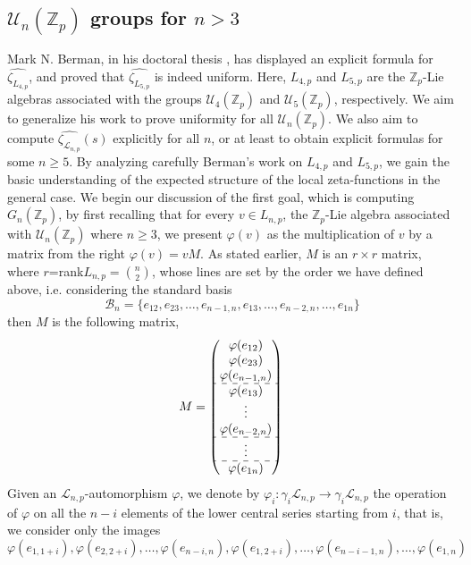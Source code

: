 \documentclass[12pt]{article}
\begin{document}
\subsection{$\mathcal{U}_n(\mathbb{Z}_p)$ groups for $n>3$}
Mark N. Berman, in his doctoral thesis \cite{Berman}, has displayed an explicit formula for $\hat{\zeta_{L_{4,p}}}$, and proved that $\hat{\zeta_{L_{5,p}}}$ is indeed uniform. Here, $L_{4,p}$ and $L_{5,p}$ are the $\mathbb{Z}_p$-Lie algebras associated with the groups $\mathcal{U}_4(\mathbb{Z}_p)$ and $\mathcal{U}_5(\mathbb{Z}_p)$, respectively. We aim to generalize his work to prove uniformity for all $\mathcal{U}_n(\mathbb{Z}_p)$. We also aim to compute $\hat{\zeta_{\mathcal{L}_{n,p}}}(s)$ explicitly for all $n$, or at least to obtain explicit formulas for some $n\geq 5$. By analyzing carefully Berman's work on $L_{4,p}$ and $L_{5,p}$, we gain the basic understanding of the expected structure of the local zeta-functions in the general case.
We begin our discussion of the first goal, which is computing $G_n(\mathbb{Z}_p)$, by first recalling that for every $v\in L_{n,p}$, the $\mathbb{Z}_p$-Lie algebra associated with $\mathcal{U}_n(\mathbb{Z}_p)$ where $n\geq3$, we present $\varphi(v)$ as the multiplication of $v$ by a matrix from the right $\varphi(v)=vM$. As stated earlier, $M$ is an $r\times r$ matrix, where $r$=rank$L_{n,p}=\binom{n}{2}$, whose lines are set by the order we have defined above, i.e. considering the standard basis \[\mathcal{B}_n=\{e_{
12},e_{23},\dots,e_{n-1,n},e_{13},\dots,e_{n-2,n},\dots,e_{1n}\}\] then $M$ is the following matrix,
$$
M=\begin{pmatrix}
\varphi(e_{12})\\
\varphi(e_{23})\\
\varphi(e_{n-1,n})\\
\hdashline
\varphi(e_{13})\\
\vdots\\
\varphi(e_{n-2,n})\\
\hdashline
\vdots\\
\hdashline
\varphi(e_{1n})\\
\end{pmatrix}\\
$$
Given an $\mathcal{L}_{n,p}$-automorphism $\varphi$, we denote by $\varphi_i:\gamma_i\mathcal{L}_{n,p}\rightarrow\gamma_i\mathcal{L}_{n,p}$ the operation of $\varphi$ on all the $n-i$ elements of the lower central series starting from $i$, that is, we consider only the images \[\varphi(e_{1,1+i}),\varphi(e_{2,2+i}),\dots,\varphi(e_{n-i,n}),\varphi(e_{1,2+i}),\dots,\varphi(e_{n-i-1,n}),\dots,\varphi(e_{1,n})\]
\end{document}
